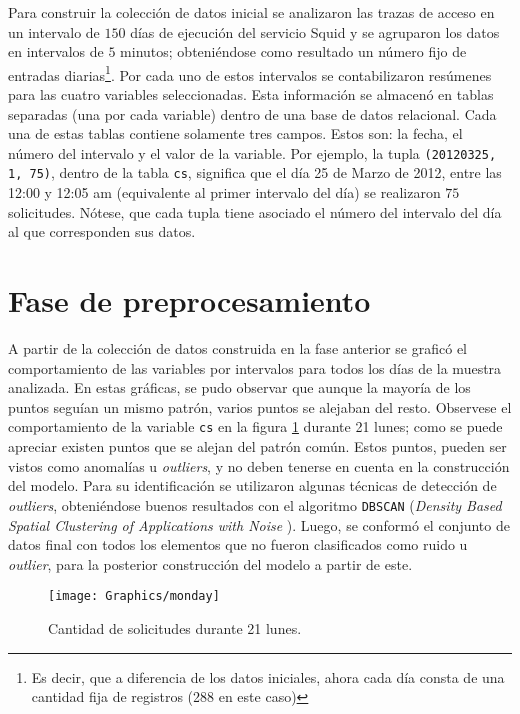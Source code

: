 Para construir la colección de datos inicial se analizaron las trazas de acceso
en un intervalo de $150$ días de ejecución del servicio Squid y se agruparon los
datos en intervalos de $5$ minutos; obteniéndose como resultado un número fijo
de entradas diarias\footnote{Es decir, que a diferencia de los datos iniciales,
ahora cada día consta de una cantidad fija de registros (288 en este caso)}. Por
cada uno de estos intervalos se contabilizaron resúmenes para las cuatro
variables seleccionadas. Esta información se almacenó en tablas separadas (una
por cada variable) dentro de una base de datos relacional. Cada una de estas
tablas contiene solamente tres campos. Estos son: la fecha, el número del
intervalo y el valor de la variable. Por ejemplo, la tupla \verb+(20120325, 1, 75)+, 
dentro de la tabla \texttt{cs}, significa que el día 25 de Marzo de 2012,
entre las 12:00 y 12:05 am (equivalente al primer intervalo del día) se
realizaron $75$ solicitudes. Nótese, que cada tupla tiene asociado el número del
intervalo del día al que corresponden sus datos.

\section{Fase de preprocesamiento}
A partir de la colección de datos construida en la fase anterior se graficó el
comportamiento de las variables por intervalos para todos los días de la muestra
analizada. En estas gráficas, se pudo observar que aunque la mayoría de los
puntos seguían un mismo patrón, varios puntos se alejaban del resto. Observese
el comportamiento de la variable \texttt{cs} en la figura \ref{fig:cs_monday}
durante 21 lunes; como se puede apreciar existen puntos que se alejan del patrón
común. Estos puntos, pueden ser vistos como anomalías u \textit{outliers}, y no
deben tenerse en cuenta en la construcción del modelo. Para su identificación se
utilizaron algunas técnicas de detección de \textit{outliers}, obteniéndose
buenos resultados con el algoritmo \texttt{DBSCAN} (\textit{Density Based
Spatial Clustering of Applications with Noise })\cite{Ester1996}. Luego, se
conformó el conjunto de datos final con todos los elementos que no fueron
clasificados como ruido u \textit{outlier}, para la posterior construcción del
modelo a partir de este. %

\begin{figure}[!h]
 \begin{center}
  \texttt{[image: Graphics/monday]}  
 \end{center}
 \caption{Cantidad de solicitudes durante 21 lunes.}
 \label{fig:cs_monday}
\end{figure}

